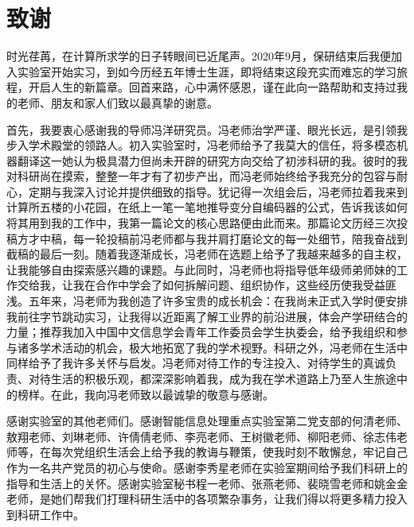 \chapter[致谢]{致\quad 谢}%

时光荏苒，在计算所求学的日子转眼间已近尾声。2020年9月，保研结束后我便加入实验室开始实习，到如今历经五年博士生涯，即将结束这段充实而难忘的学习旅程，开启人生的新篇章。回首来路，心中满怀感恩，谨在此向一路帮助和支持过我的老师、朋友和家人们致以最真挚的谢意。

首先，我要衷心感谢我的导师冯洋研究员。冯老师治学严谨、眼光长远，是引领我步入学术殿堂的领路人。初入实验室时，冯老师给予了我莫大的信任，将多模态机器翻译这一她认为极具潜力但尚未开辟的研究方向交给了初涉科研的我。彼时的我对科研尚在摸索，整整一年才有了初步产出，而冯老师始终给予我充分的包容与耐心，定期与我深入讨论并提供细致的指导。犹记得一次组会后，冯老师拉着我来到计算所五楼的小花园，在纸上一笔一笔地推导变分自编码器的公式，告诉我该如何将其用到我的工作中，我第一篇论文的核心思路便由此而来。那篇论文历经三次投稿方才中稿，每一轮投稿前冯老师都与我并肩打磨论文的每一处细节，陪我奋战到截稿的最后一刻。随着我逐渐成长，冯老师在选题上给予了我越来越多的自主权，让我能够自由探索感兴趣的课题。与此同时，冯老师也将指导低年级师弟师妹的工作交给我，让我在合作中学会了如何拆解问题、组织协作，这些经历使我受益匪浅。五年来，冯老师为我创造了许多宝贵的成长机会：在我尚未正式入学时便安排我前往字节跳动实习，让我得以近距离了解工业界的前沿进展，体会产学研结合的力量；推荐我加入中国中文信息学会青年工作委员会学生执委会，给予我组织和参与诸多学术活动的机会，极大地拓宽了我的学术视野。科研之外，冯老师在生活中同样给予了我许多关怀与启发。冯老师对待工作的专注投入、对待学生的真诚负责、对待生活的积极乐观，都深深影响着我，成为我在学术道路上乃至人生旅途中的榜样。在此，我向冯老师致以最诚挚的敬意与感谢。

感谢实验室的其他老师们。感谢智能信息处理重点实验室第二党支部的何清老师、敖翔老师、刘琳老师、许倩倩老师、李亮老师、王树徽老师、柳阳老师、徐志伟老师等，在每次党组织生活会上给予我的教诲与鞭策，使我时刻不敢懈怠，牢记自己作为一名共产党员的初心与使命。感谢李秀星老师在实验室期间给予我们科研上的指导和生活上的关怀。感谢实验室秘书程一老师、张燕老师、裴晓雪老师和姚金金老师，是她们帮我们打理科研生活中的各项繁杂事务，让我们得以将更多精力投入到科研工作中。

